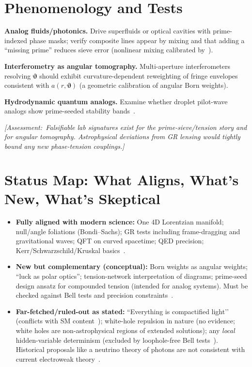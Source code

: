 \documentclass[reprint,amsmath,amssymb,aps,pra]{revtex4-2} %
\newcommand{\polangb}{\boldsymbol{\vartheta}}  %
\newcommand{\Assessment}[1]{\par\smallskip\noindent\textit{\color{blue}[Assessment:\ #1]}\par\smallskip}
\begin{document}
\section{Phenomenology and Tests}
\textbf{Analog fluids/photonics.} Drive superfluids or optical cavities with prime-indexed phase masks; verify composite lines appear by mixing and that adding a ``missing prime'' reduces sieve error (nonlinear mixing calibrated by~\cite{BoydNLO}).

\textbf{Interferometry as angular tomography.} Multi-aperture interferometers resolving $\polangb$ should exhibit curvature-dependent reweighting of fringe envelopes consistent with $a(r,\polangb)$ (a geometric calibration of angular Born weights).

\textbf{Hydrodynamic quantum analogs.} Examine whether droplet pilot-wave analogs show prime-seeded stability bands~\cite{CouderFort2006,Bush2015}.

\Assessment{Falsifiable lab signatures exist for the prime-sieve/tension story and for angular tomography. Astrophysical deviations from GR lensing would tightly bound any new phase-tension couplings.}

\section{Status Map: What Aligns, What’s New, What’s Skeptical}
\begin{itemize}
\item \textbf{Fully aligned with modern science:} One 4D Lorentzian manifold; null/angle foliations (Bondi–Sachs); GR tests including frame-dragging and gravitational waves; QFT on curved spacetime; QED precision; Kerr/Schwarzschild/Kruskal basics~\cite{Will2014,LIGO2016,GPB2011,BirrellDavies,ParkerToms,Kerr1963,Kraniotis2005,Kruskal1960,PDG2024}.
\item \textbf{New but complementary (conceptual):} Born weights as angular weights; “luck as polar optics”; tension-network interpretation of diagrams; prime-seed design ansatz for compounded tension (intended for analog systems). Must be checked against Bell tests and precision constraints~\cite{Hensen2015,Giustina2015,Shalm2015,Bohm1952}.
\item \textbf{Far-fetched/ruled-out as stated:} ``Everything is compactified light’’ (conflicts with SM content~\cite{PDG2024}); white-hole repulsion in nature (no evidence; white holes are non-astrophysical regions of extended solutions); any \emph{local} hidden-variable determinism (excluded by loophole-free Bell tests~\cite{Hensen2015,Giustina2015,Shalm2015}). Historical proposals like a neutrino theory of photons are not consistent with current electroweak theory~\cite{Perkins1965,PDG2024}.
\end{itemize}
\end{document}
